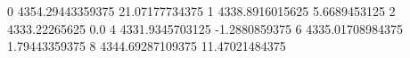 0 4354.29443359375 21.07177734375
1 4338.8916015625 5.6689453125
2 4333.22265625 0.0
4 4331.9345703125 -1.2880859375
6 4335.01708984375 1.79443359375
8 4344.69287109375 11.47021484375
